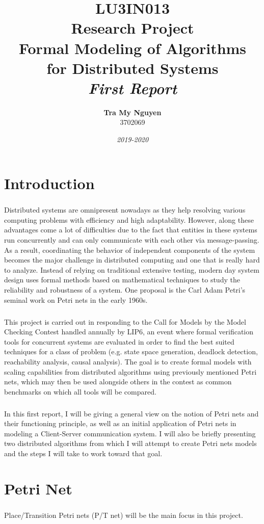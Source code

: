 \documentclass{article}
\title{\textbf{{\large LU3IN013}\\Research Project}\\{\Huge Formal Modeling of Algorithms\\for Distributed Systems}\\\textit{First Report}}
\author{\Large\textbf{Tra My Nguyen}\\{\large 3702069}}
\date{\textit{2019-2020}}
\begin{document}
	
	\maketitle
	\newpage
	
	\section{Introduction}
	
	\subparagraph{}Distributed systems are omnipresent nowadays as they help resolving various computing problems with efficiency and high adaptability. However, along these advantages come a lot of difficulties due to the fact that entities in these systems run concurrently and can only communicate with each other via message-passing. As a result, coordinating the behavior of independent components of the system becomes the major challenge in distributed computing and one that is really hard to analyze. Instead of relying on traditional extensive testing, modern day system design uses formal methods based on mathematical techniques to study the reliability and robustness of a system. One proposal is the Carl Adam Petri's seminal work on Petri nets in the early 1960s.
	\subparagraph{}This project is carried out in responding to the Call for Models by the Model Checking Contest handled annually by LIP6, an event where formal verification tools for concurrent systems are evaluated in order to find the best suited techniques for a class of problem (e.g. state space generation, deadlock detection, reachability analysis, causal analysis). The goal is to create formal models with scaling capabilities from distributed algorithms using previously mentioned Petri nets, which may then be used alongside others in the contest as common benchmarks on which all tools will be compared.
	\subparagraph{}In this first report, I will be giving a general view on the notion of Petri nets and their functioning principle, as well as an initial application of Petri nets in modeling a Client-Server communication system. I will also be briefly presenting two distributed algorithms from which I will attempt to create Petri nets models and the steps I will take to work toward that goal.
	
	\section{Petri Net}
	\subparagraph{}Place/Transition Petri nets (P/T net) will be the main focus in this project.
			
\end{document}
